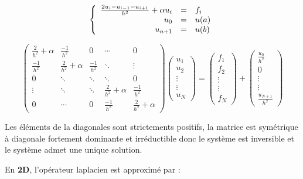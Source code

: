 \documentclass[a4paper,12pt,twoside]{report}
\begin{document}
\[
\left\{
\begin{array}{r c l}
 \frac{2u_{i}-u_{i-1} -u_{i+1}}{h^{2}}  + \alpha u_{i }&=& f_{i}  \\
 u_{0}&=&u(a)\\
u_{n+1} &=& u(b)
\end{array}
\right.
\]


\[
\begin{pmatrix}
   \frac{2}{h^{2}} +\alpha & \frac{-1}{h^{2}}  &0 &\cdots & 0 \\
   \frac{-1}{h^{2}}  & \frac{2}{h^{2}}  +\alpha & \frac{-1}{h^{2}} & \ddots &  \vdots \\ 0  & \ddots &  \ddots &  \ddots & 0\\
   \vdots & \ddots & \ddots  & \frac{2}{h^{2}} +\alpha &  \frac{-1}{h^{2}}\\
 0 & \cdots & 0 & \frac{-1}{h^{2}} & \frac{2}{h^{2}} +\alpha
\end{pmatrix}
\begin{pmatrix}
  u_{1} \\
  u_{2}\\ 
   \vdots\\
   \vdots\\
 u_{N}
\end{pmatrix} = \begin{pmatrix}
  f_{1} \\
   f_{2} \\ 
   \vdots\\
   \vdots\\
f_{N}
\end{pmatrix} +  \begin{pmatrix}
   \frac{u_{0}}{h^{2}} \\
   0 \\ 
   \vdots\\
   \vdots\\
 \frac{u_{N+1}}{h^{2}} 
\end{pmatrix} \]


Les éléments de la diagonales sont strictements positifs, la matrice est symétrique à diagonale fortement dominante et irréductible donc le système est inversible et le système admet une unique solution.

En \textbf{\color[rgb]{0,0.13,0.75 }2D}, l'opérateur laplacien est approximé par : 
\end{document}
